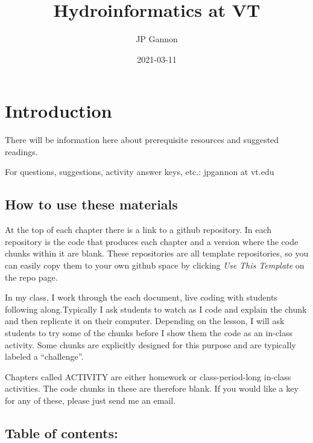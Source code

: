 \documentclass[
]{book}
\title{Hydroinformatics at VT}
\author{JP Gannon}
\date{2021-03-11}
\begin{document}
\maketitle

{
\setcounter{tocdepth}{1}
\tableofcontents
}
\hypertarget{introduction}{%
\chapter{Introduction}\label{introduction}}

There will be information here about prerequisite resources and suggested readings.

For questions, suggestions, activity answer keys, etc.: jpgannon at vt.edu

\hypertarget{how-to-use-these-materials}{%
\section{How to use these materials}\label{how-to-use-these-materials}}

At the top of each chapter there is a link to a github repository. In each repository is the code that produces each chapter and a version where the code chunks within it are blank. These repositories are all template repositories, so you can easily copy them to your own github space by clicking \emph{Use This Template} on the repo page.

In my class, I work through the each document, live coding with students following along.Typically I ask students to watch as I code and explain the chunk and then replicate it on their computer. Depending on the lesson, I will ask students to try some of the chunks before I show them the code as an in-class activity. Some chunks are explicitly designed for this purpose and are typically labeled a ``challenge''.

Chapters called ACTIVITY are either homework or class-period-long in-class activities. The code chunks in these are therefore blank. If you would like a key for any of these, please just send me an email.

\hypertarget{table-of-contents}{%
\section{Table of contents:}\label{table-of-contents}}
\end{document}
